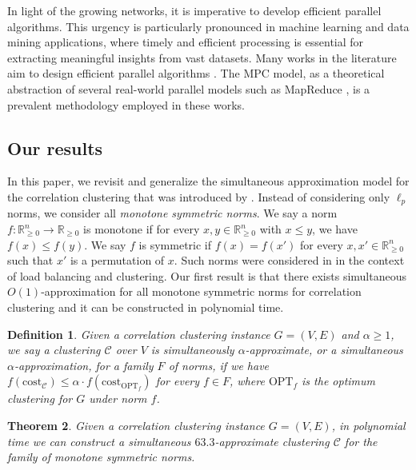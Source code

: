 \documentclass[11pt]{article}
\newcommand{\R}{\mathbb{R}}
\newcommand{\cost}{\mathrm{cost}}
\newtheorem{theorem}{Theorem}[section]
\newtheorem{definition}[theorem]{Definition}
\newcommand{\calC}{{\mathcal{C}}}
\newcommand{\OPT}{\mathrm{OPT}}
\begin{document}
\begin{CJK*}{UTF8}{gbsn}
In light of the growing networks, it is imperative to develop efficient parallel algorithms. This urgency is particularly pronounced in machine learning and data mining applications, where timely and efficient processing is essential for extracting meaningful insights from vast datasets.
Many works in the literature aim to design efficient parallel algorithms \cite{blelloch2012greedy, chierichetti2014correlation, DBLP:conf/nips/PanPORRJ15, fischer2019tight, DBLP:conf/wdag/CambusCMU21, cohen2021correlation, DBLP:conf/innovations/Assadi022, cambus20243+, cao2024breaking}. 
The MPC model, as a theoretical abstraction of several real-world parallel models such as MapReduce \cite{dean2008mapreduce}, is a prevalent methodology employed in these works.








\subsection{Our results}
In this paper, we revisit and generalize the simultaneous approximation model for the correlation clustering that was introduced by \cite{davies2023one}. Instead of considering only $\ell_p$ norms, we consider all \emph{monotone symmetric norms}. We say a norm $f:\R_{\geq 0}^n \to \R_{\geq 0}$ is monotone if for every $x, y \in \R_{\geq 0}^n$ with $x \leq y$, we have $f(x) \leq f(y)$. We say $f$ is symmetric if $f(x) = f(x')$ for every $x, x' \in \R_{\geq 0}^n$ such that $x'$ is a permutation of $x$. Such norms were considered in \cite{chakrabarty2019approximation} in the context of load balancing and clustering.  Our first result is that there exists simultaneous $O(1)$-approximation for all monotone symmetric norms for correlation clustering and it can be constructed in polynomial time.
\begin{definition}
    Given a correlation clustering instance $G = (V, E)$ and $\alpha \geq 1$, we say a clustering $\calC$ over $V$ is simultaneously $\alpha$-approximate, or a simultaneous $\alpha$-approximation, for a family $F$ of norms, if we have $f(\cost_\calC) \leq \alpha \cdot f(\cost_{\OPT_f})$ for every $f \in F$, where $\OPT_f$ is the optimum clustering for $G$ under norm $f$.
\end{definition}

\begin{theorem}
\label{thm:sequentialAlgorithm}
    Given a correlation clustering instance $G = (V, E)$, in polynomial time we can construct a simultaneous $63.3$-approximate clustering $\calC$ for the family of monotone symmetric norms.
\end{theorem}


\end{CJK*}
\end{document}
